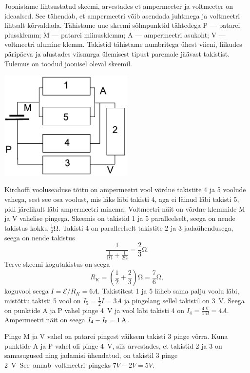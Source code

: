 \solu
Joonistame lihtsustatud skeemi, arvestades et ampermeeter ja voltmeeter 
on ideaalsed. See tähendab, et ampermeetri võib asendada juhtmega ja 
voltmeetri lihtsalt kõrvaldada. Tähistame uue skeemi sõlmpunktid 
tähtedega P --- patarei plussklemm; M --- patarei miinusklemm; A --- 
ampermeetri asukoht; V --- voltmeetri alumine klemm. Takistid tähistame 
numbritega ühest viieni, liikudes päripäeva ja alustades viisnurga 
ülemisest tipust paremale jäävast takistist. Tulemus on toodud joonisel 
oleval skeemil.
\begin{center}
	\includegraphics[width=0.5\textwidth]{2017-v3g-06-viisnurk-lah}
\end{center}
Kirchoffi vooluseaduse tõttu on ampermeetri vool võrdne 
takistite 4 ja 5 voolude vahega, sest see osa voolust, mis läks läbi takisti 4, aga ei läinud läbi takisti 5, pidi järelikult läbi ampermeetri minema. Voltmeetri näit on võrdne klemmide 
M ja V vahelise pingega.
Skeemis on takistid 1 ja 5 paralleelselt, seega on nende takistus kokku $\frac{1}{2}\si{\ohm}$. Takisti 4 on paralleelselt 
takistite 2 ja 3 jadaühendusega, seega on nende takistus
\[
\frac{1}{\frac{1}{1\si{\ohm}}+\frac{1}{2\si{\ohm}}} = \frac 23 \si{\ohm}.
\]
Terve skeemi kogutakistus on seega
\[
R_K=\left(\frac 12 + 
\frac 23\right)\si{\ohm}=\frac 76\si{\ohm},
\]
koguvool seega $I=\mathcal 
E/R_K=\SI{6}A$. Takistitest 1 ja 5 läheb sama palju voolu läbi,
mistõttu takisti 5 vool on $I_5=\frac 12 I=\SI{3}A$ ja pingelang sellel takistil on \SI{3}{\volt}. Seega on punktide A ja P vahel pinge \SI{4}{\volt} ja vool läbi takisti 4 
on $I_4=\frac{\SI{4}{\volt}}{\SI{1}{\ohm}}=\SI{4}A$. Ampermeetri
näit on seega $I_4-I_5=\SI 1A$.

Pinge M ja V vahel on patarei pingest väiksem takisti 3 pinge võrra. Kuna punktide A ja P vahel oli pinge \SI{4}{\volt}, siis arvestades, et takistid 2 ja 3 on samasugused ning jadamisi ühendatud, on takistil 3 pinge \SI{2}V. 
See annab voltmeetri pingeks $\SI{7}V -\SI{2}V= \SI{5}V$.

